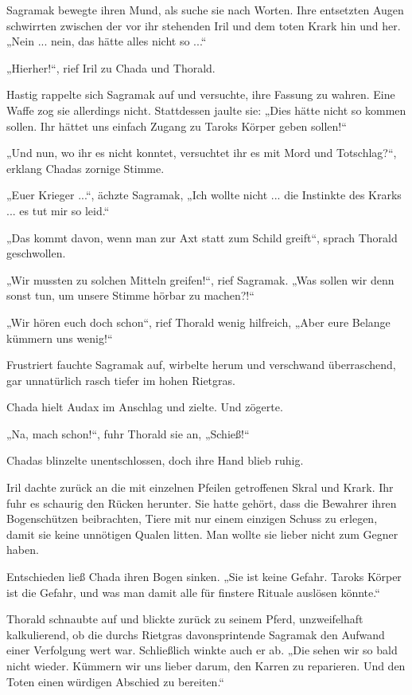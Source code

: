 Sagramak bewegte ihren Mund, als suche sie nach Worten. Ihre entsetzten Augen schwirrten zwischen der vor ihr stehenden Iril und dem toten Krark hin und her. „Nein ... nein, das hätte alles nicht so ...“

„Hierher!“, rief Iril zu Chada und Thorald.

Hastig rappelte sich Sagramak auf und versuchte, ihre Fassung zu wahren. Eine Waffe zog sie allerdings nicht. Stattdessen jaulte sie: „Dies hätte nicht so kommen sollen. Ihr hättet uns einfach Zugang zu Taroks Körper geben sollen!“

„Und nun, wo ihr es nicht konntet, versuchtet ihr es mit Mord und Totschlag?“, erklang Chadas zornige Stimme.

„Euer Krieger ...“, ächzte Sagramak, „Ich wollte nicht ... die Instinkte des Krarks ... es tut mir so leid.“

„Das kommt davon, wenn man zur Axt statt zum Schild greift“, sprach Thorald geschwollen.

„Wir mussten zu solchen Mitteln greifen!“, rief Sagramak. „Was sollen wir denn sonst tun, um unsere Stimme hörbar zu machen?!“

„Wir hören euch doch schon“, rief Thorald wenig hilfreich, „Aber eure Belange kümmern uns wenig!“

Frustriert fauchte Sagramak auf, wirbelte herum und verschwand überraschend, gar unnatürlich rasch tiefer im hohen Rietgras.

Chada hielt Audax im Anschlag und zielte. Und zögerte.

„Na, mach schon!“, fuhr Thorald sie an, „Schieß!“

Chadas blinzelte unentschlossen, doch ihre Hand blieb ruhig.

Iril dachte zurück an die mit einzelnen Pfeilen getroffenen Skral und Krark. Ihr fuhr es schaurig den Rücken herunter. Sie hatte gehört, dass die Bewahrer ihren Bogenschützen beibrachten, Tiere mit nur einem einzigen Schuss zu erlegen, damit sie keine unnötigen Qualen litten. Man wollte sie lieber nicht zum Gegner haben.

Entschieden ließ Chada ihren Bogen sinken. „Sie ist keine Gefahr. Taroks Körper ist die Gefahr, und was man damit alle für finstere Rituale auslösen könnte.“

Thorald schnaubte auf und blickte zurück zu seinem Pferd, unzweifelhaft kalkulierend, ob die durchs Rietgras davonsprintende Sagramak den Aufwand einer Verfolgung wert war. Schließlich winkte auch er ab. „Die sehen wir so bald nicht wieder. Kümmern wir uns lieber darum, den Karren zu reparieren. Und den Toten einen würdigen Abschied zu bereiten.“

